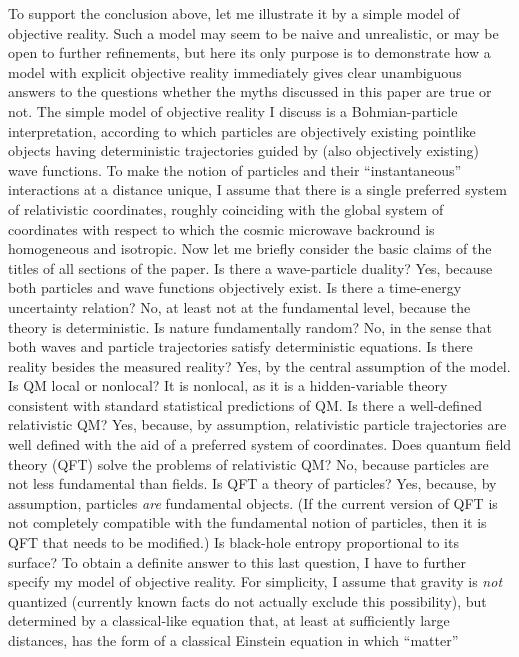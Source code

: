 \documentclass[12pt]{article}
\begin{document}
To support the conclusion above, let me illustrate it by a simple 
model of objective reality. Such a model may seem to be 
naive and unrealistic, or may be open to further refinements, 
but here its only purpose is to demonstrate how a
model with explicit objective reality immediately gives clear
unambiguous answers to the questions whether the myths discussed 
in this paper are true or not. The simple model of objective reality  
I discuss is a Bohmian-particle interpretation, according to which 
particles are objectively existing pointlike objects having deterministic 
trajectories guided by (also objectively existing) wave functions.
To make the notion of particles and their ``instantaneous'' interactions
at a distance unique, I assume that there is a single preferred system of 
relativistic coordinates, roughly coinciding with the global system 
of coordinates with respect to which the cosmic microwave backround 
is homogeneous and isotropic. Now let me briefly consider the basic claims
of the titles of all sections of the paper.
Is there a wave-particle duality? Yes, because both particles and wave
functions 
objectively exist. Is there a time-energy uncertainty relation? No,
at least not at the fundamental level, because the theory is 
deterministic. Is nature fundamentally 
random? No, in the sense that both waves and particle trajectories satisfy 
deterministic equations. Is there reality besides the measured reality?
Yes, by the central assumption of the model. 
Is QM local or nonlocal? It is nonlocal,
as it is a hidden-variable theory consistent with standard 
statistical predictions of QM.
Is there a well-defined relativistic QM? Yes, because, by assumption, 
relativistic particle trajectories are well defined with the aid of a 
preferred system of coordinates. Does quantum field theory (QFT) 
solve the problems of relativistic QM? No, because particles are 
not less fundamental than fields. Is QFT a theory of particles?
Yes, because, by assumption, particles {\em are} fundamental
objects. (If the current version of QFT is not completely compatible 
with the fundamental notion of particles, then it is QFT that 
needs to be modified.) 
Is black-hole entropy proportional to its surface? To obtain 
a definite answer to this last question, I have to further specify 
my model of objective reality. For simplicity, I assume that
gravity is {\em not} quantized (currently known facts
do not actually exclude this possibility), but determined
by a classical-like equation that, at least at sufficiently large
distances, has the form of a classical Einstein equation in which ``matter'' 
\end{document}
